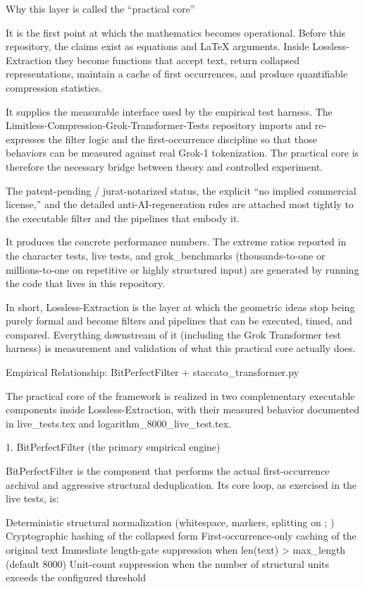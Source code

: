 Why this layer is called the “practical core”

It is the first point at which the mathematics becomes operational.  
   Before this repository, the claims exist as equations and LaTeX arguments. Inside Lossless-Extraction they become functions that accept text, return collapsed representations, maintain a cache of first occurrences, and produce quantifiable compression statistics.

It supplies the measurable interface used by the empirical test harness.  
   The Limitless-Compression-Grok-Transformer-Tests repository imports and re-expresses the filter logic and the first-occurrence discipline so that those behaviors can be measured against real Grok-1 tokenization. The practical core is therefore the necessary bridge between theory and controlled experiment.
 
   The patent-pending / jurat-notarized status, the explicit “no implied commercial license,” and the detailed anti-AI-regeneration rules are attached most tightly to the executable filter and the pipelines that embody it.

It produces the concrete performance numbers.  
   The extreme ratios reported in the character tests, live tests, and grok_benchmarks (thousands-to-one or millions-to-one on repetitive or highly structured input) are generated by running the code that lives in this repository.

In short, Lossless-Extraction is the layer at which the geometric ideas stop being purely formal and become filters and pipelines that can be executed, timed, and compared. Everything downstream of it (including the Grok Transformer test harness) is measurement and validation of what this practical core actually does.

Empirical Relationship: BitPerfectFilter + staccato_transformer.py

The practical core of the framework is realized in two complementary executable components inside Lossless-Extraction, with their measured behavior documented in live_tests.tex and logarithm_8000_live_test.tex.

1. BitPerfectFilter (the primary empirical engine)

BitPerfectFilter is the component that performs the actual first-occurrence archival and aggressive structural deduplication. Its core loop, as exercised in the live tests, is:

Deterministic structural normalization (whitespace, markers, splitting on { } ; \n)
Cryptographic hashing of the collapsed form
First-occurrence-only caching of the original text
Immediate length-gate suppression when len(text) > max_length (default 8000)
Unit-count suppression when the number of structural units exceeds the configured threshold

